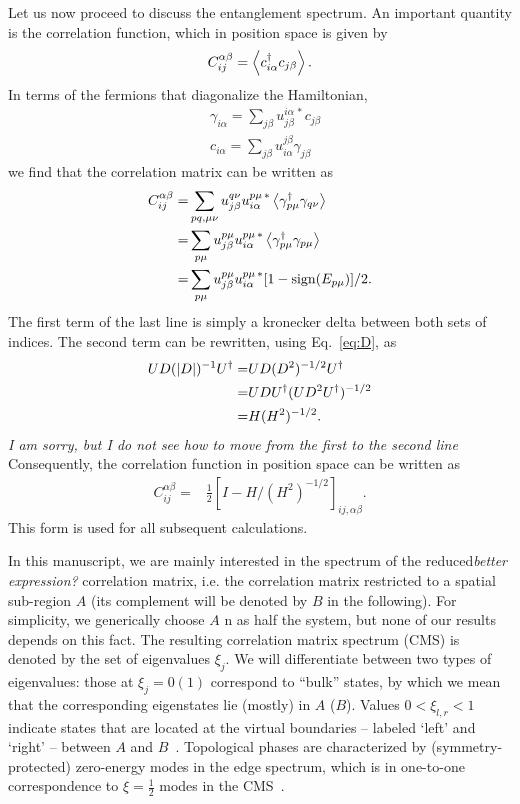 \documentclass[twocolumn,amsmath,longbibliography,amssymb,superscriptaddress]{revtex4-1}
\newcommand{\mariac}[1]{{\it\color{cyan}#1}}
\begin{document}
Let us now proceed to discuss the entanglement spectrum. 
An important quantity is the correlation function, which in position space is given by
\begin{align}
C_{ij}^{\alpha \beta} = \expval{c_{i\alpha}^\dagger c_{j\beta}}.
\end{align}
In terms of the fermions that diagonalize the Hamiltonian, 
\begin{align}
& \gamma_{i\alpha} = \sum_{j\beta}u_{j\beta}^{i\alpha \, \ast} c_{j\beta} \nonumber\\
& c_{i\alpha} = \sum_{j\beta} u^{j\beta}_{i\alpha} \gamma_{j\beta}
\end{align}
we find that the correlation matrix can be written as 
\begin{align}\label{eq:corr_mat}
C_{ij}^{\alpha \beta} =& \sum_{pq,\mu\nu} u^{q\nu }_{j\beta} u^{p\mu \, \ast}_{i\alpha} \expval{\gamma^\dagger_{p\mu} \gamma_{q\nu} }\nonumber \\
=&  \sum_{p\mu} u^{p\mu }_{j\beta} u^{p\mu \, \ast}_{i\alpha} \expval{\gamma^\dagger_{p\mu} \gamma_{p\mu} }\nonumber \\
=&  \sum_{p\mu} u^{p\mu }_{j\beta} u^{p\mu \, \ast}_{i\alpha} [1-{\rm sign}(E_{p\mu})]/2.
\end{align}
The first term of the last line is simply a kronecker delta between both sets of indices. 
The second term can be rewritten, using Eq.~\ref{eq:D}, as
\begin{align}\label{eq:C_rewritten}
UD(\abs{D})^{-1}U^\dagger =& UD(D^2)^{-1/2}U^\dagger\nonumber \\
=& U D U^\dagger (U D^2 U^\dagger)^{-1/2}\nonumber \\
=& H(H^2)^{-1/2}.
\end{align}
\mariac{I am sorry, but I do not see how to move from the first to the second line}
Consequently,  the correlation function in position space can be written  as
\begin{align}\label{eq:corr_mat2}
C_{ij}^{\alpha \beta} =& \frac{1}{2}\left[I - H/ (H^2)^{-1/2} \right]_{ij, \alpha \beta}.
\end{align}
This form is used for all subsequent calculations. 

In this manuscript, we are mainly interested in the spectrum of the reduced\mariac{better expression?} correlation matrix, i.e. the correlation matrix restricted to a spatial sub-region $A$ (its complement will be denoted by $B$ in the following). 
For simplicity, we generically choose $A$ n as half the system, but none of our results depends on this fact. 
The resulting correlation matrix spectrum (CMS) is  denoted by the set of eigenvalues $\xi_j$. 
We will differentiate between two types of eigenvalues: those at $\xi_j=0 (1)$ correspond to ``bulk'' states, by which we mean that the corresponding eigenstates lie (mostly) in  $A$ ($B$). 
Values $0<\xi_{l,r}<1$ indicate states that are located at the virtual boundaries -- labeled `left' and `right' -- between $A$ and $B$~\cite{Peschel2008}. 
Topological phases are characterized by (symmetry-protected) zero-energy modes in the edge spectrum, which is in one-to-one correspondence to $\xi=\frac 1 2$ modes in the CMS~\cite{Fidkowski2010entanglement}.
 
\end{document}
